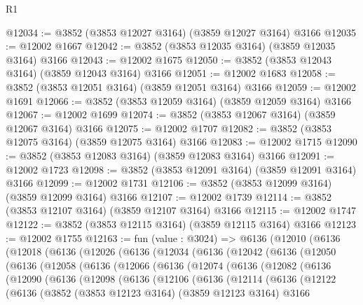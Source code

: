 \begin{lexlean}{R1}
\begin{coremodule}
@12034 := @3852 (@3853 @12027 @3164) (@3859 @12027 @3164) @3166
@12035 := @12002 @1667
@12042 := @3852 (@3853 @12035 @3164) (@3859 @12035 @3164) @3166
@12043 := @12002 @1675
@12050 := @3852 (@3853 @12043 @3164) (@3859 @12043 @3164) @3166
@12051 := @12002 @1683
@12058 := @3852 (@3853 @12051 @3164) (@3859 @12051 @3164) @3166
@12059 := @12002 @1691
@12066 := @3852 (@3853 @12059 @3164) (@3859 @12059 @3164) @3166
@12067 := @12002 @1699
@12074 := @3852 (@3853 @12067 @3164) (@3859 @12067 @3164) @3166
@12075 := @12002 @1707
@12082 := @3852 (@3853 @12075 @3164) (@3859 @12075 @3164) @3166
@12083 := @12002 @1715
@12090 := @3852 (@3853 @12083 @3164) (@3859 @12083 @3164) @3166
@12091 := @12002 @1723
@12098 := @3852 (@3853 @12091 @3164) (@3859 @12091 @3164) @3166
@12099 := @12002 @1731
@12106 := @3852 (@3853 @12099 @3164) (@3859 @12099 @3164) @3166
@12107 := @12002 @1739
@12114 := @3852 (@3853 @12107 @3164) (@3859 @12107 @3164) @3166
@12115 := @12002 @1747
@12122 := @3852 (@3853 @12115 @3164) (@3859 @12115 @3164) @3166
@12123 := @12002 @1755
@12163 := fun (value : @3024) =>
  @6136
    (@12010
      (@6136
        (@12018
          (@6136
            (@12026
              (@6136
                (@12034
                  (@6136
                    (@12042
                      (@6136
                        (@12050
                          (@6136
                            (@12058
                              (@6136
                                (@12066
                                  (@6136
                                    (@12074
                                      (@6136
                                        (@12082
                                          (@6136
                                            (@12090
                                              (@6136
                                                (@12098
                                                  (@6136
                                                    (@12106
                                                      (@6136
                                                        (@12114
                                                          (@6136
                                                            (@12122
                                                              (@6136
                                                                (@3852
                                                                  (@3853 @12123 @3164)
                                                                  (@3859 @12123 @3164)
                                                                  @3166

\end{coremodule}
\end{lexlean}
